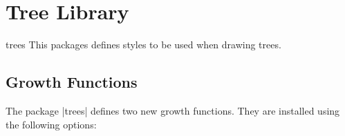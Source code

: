 %
%
%


\section{Tree Library}
\label{section-tree-library}

\begin{tikzlibrary}{trees}
    This packages defines styles to be used when drawing trees.
\end{tikzlibrary}
%
\begin{codeexample}
    \usetikzlibrary{trees}
\end{codeexample}


\subsection{Growth Functions}

The package |trees| defines two new growth functions. They are installed using
the following options:

